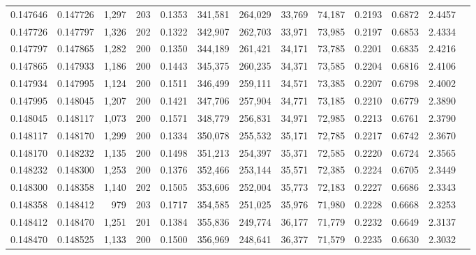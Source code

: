 \begin{tabular}{rrrrrrrrrrrrr}
0.147646 & 0.147726 & 1,297 & 203 &                                     0.1353 & 341,581 & 264,029 &  33,769 &  74,187 & 0.2193 & 0.6872 & 2.4457 \\
0.147726 & 0.147797 & 1,326 & 202 &                                     0.1322 & 342,907 & 262,703 &  33,971 &  73,985 & 0.2197 & 0.6853 & 2.4334 \\
0.147797 & 0.147865 & 1,282 & 200 &                                     0.1350 & 344,189 & 261,421 &  34,171 &  73,785 & 0.2201 & 0.6835 & 2.4216 \\
0.147865 & 0.147933 & 1,186 & 200 &                                     0.1443 & 345,375 & 260,235 &  34,371 &  73,585 & 0.2204 & 0.6816 & 2.4106 \\
0.147934 & 0.147995 & 1,124 & 200 &                                     0.1511 & 346,499 & 259,111 &  34,571 &  73,385 & 0.2207 & 0.6798 & 2.4002 \\
0.147995 & 0.148045 & 1,207 & 200 &                                     0.1421 & 347,706 & 257,904 &  34,771 &  73,185 & 0.2210 & 0.6779 & 2.3890 \\
0.148045 & 0.148117 & 1,073 & 200 &                                     0.1571 & 348,779 & 256,831 &  34,971 &  72,985 & 0.2213 & 0.6761 & 2.3790 \\
0.148117 & 0.148170 & 1,299 & 200 &                                     0.1334 & 350,078 & 255,532 &  35,171 &  72,785 & 0.2217 & 0.6742 & 2.3670 \\
0.148170 & 0.148232 & 1,135 & 200 &                                     0.1498 & 351,213 & 254,397 &  35,371 &  72,585 & 0.2220 & 0.6724 & 2.3565 \\
0.148232 & 0.148300 & 1,253 & 200 &                                     0.1376 & 352,466 & 253,144 &  35,571 &  72,385 & 0.2224 & 0.6705 & 2.3449 \\
0.148300 & 0.148358 & 1,140 & 202 &                                     0.1505 & 353,606 & 252,004 &  35,773 &  72,183 & 0.2227 & 0.6686 & 2.3343 \\
0.148358 & 0.148412 &   979 & 203 &                                     0.1717 & 354,585 & 251,025 &  35,976 &  71,980 & 0.2228 & 0.6668 & 2.3253 \\
0.148412 & 0.148470 & 1,251 & 201 &                                     0.1384 & 355,836 & 249,774 &  36,177 &  71,779 & 0.2232 & 0.6649 & 2.3137 \\
0.148470 & 0.148525 & 1,133 & 200 &                                     0.1500 & 356,969 & 248,641 &  36,377 &  71,579 & 0.2235 & 0.6630 & 2.3032 \\

\end{tabular}
